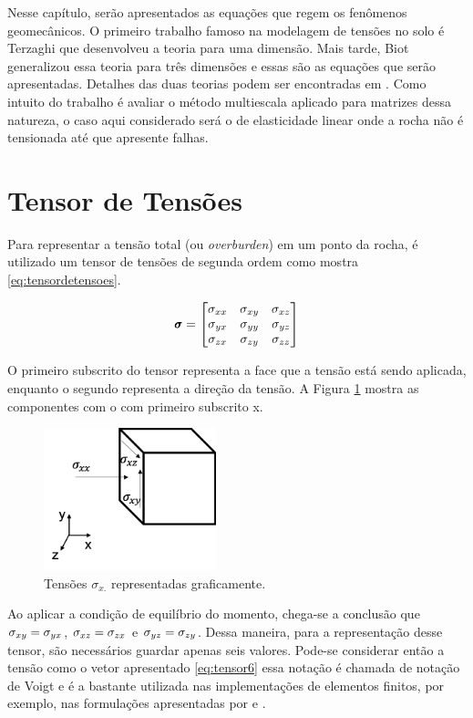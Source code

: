 
Nesse capítulo, serão apresentados as equações que regem os fenômenos geomecânicos. O primeiro trabalho famoso na modelagem de tensões no solo é Terzaghi que desenvolveu a teoria para uma dimensão. Mais tarde, Biot generalizou essa teoria para três dimensões e essas são as equações que serão apresentadas. Detalhes das duas teorias podem ser encontradas em \citet{CompGeomec}. Como intuito do trabalho é avaliar o método multiescala aplicado para matrizes dessa natureza, o caso aqui considerado será o de elasticidade linear onde a rocha não é tensionada até que apresente falhas.



\section{Tensor de Tensões}

Para representar a tensão total (ou \textit{overburden}) em um ponto da rocha, é utilizado um tensor de tensões de segunda ordem como mostra \eqref{eq:tensordetensoes}.

\begin{equation} \label{eq:tensordetensoes}
\mathbf{\pmb{\sigma}} =
    \begin{bmatrix}
    \sigma_{xx} & \sigma_{xy} & \sigma_{xz} \\
    \sigma_{yx} & \sigma_{yy} & \sigma_{yz} \\
    \sigma_{zx} & \sigma_{zy} & \sigma_{zz}
    \end{bmatrix}
\end{equation}

O primeiro subscrito do tensor representa a face que a tensão está sendo aplicada, enquanto o segundo representa a direção da tensão. A Figura \ref{fig:tensoesx} mostra as componentes com o com primeiro subscrito x.


\begin{figure}[!htbp]
\centering
\includegraphics[width=5cm]{chap01/figs/tensor.png}
\caption{Tensões $\sigma_{x.}$ representadas graficamente.}
\label{fig:tensoesx}
\end{figure}

Ao aplicar a condição de equilíbrio do momento, chega-se a conclusão que $\sigma_{xy}=\sigma_{yx}$, $\sigma_{xz}=\sigma_{zx}$ e $\sigma_{yz}=\sigma_{zy}$. Dessa maneira, para a representação desse tensor, são necessários guardar apenas seis valores. Pode-se considerar então a tensão como o vetor apresentado \eqref{eq:tensor6} essa notação é chamada de notação de Voigt e é a bastante utilizada nas implementações de elementos finitos, por exemplo, nas formulações apresentadas por \citet{hughes} e \citet{jacob}.



